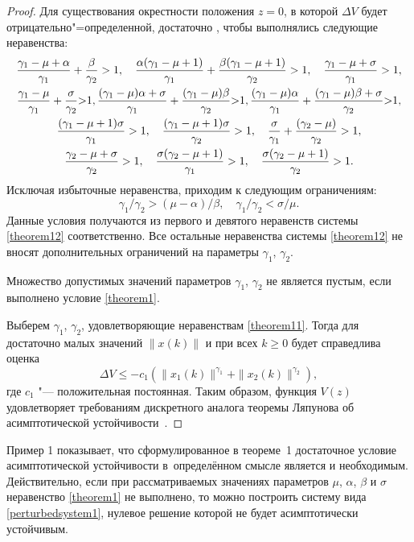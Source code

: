 \begin{proof}
Для существования окрестности положения $z=0$, в которой $\Delta
V$ будет отрицательно"=определенной, достаточно \cite{sultan:bib5}, чтобы выполнялись
следующие неравенства:
\begin{gather}
\notag
\frac{\gamma_1-\mu+\alpha}{\gamma_1}+\frac{\beta}{\gamma_2}>1,
\quad
\frac{\alpha(\gamma_1-\mu+1)}{\gamma_1}+\frac{\beta(\gamma_1-\mu+1)}{\gamma_2}>1,
\quad
\frac{\gamma_1-\mu+\sigma}{\gamma_1}>1,\\ \notag
\frac{\gamma_1-\mu}{\gamma_1}+\frac{\sigma}{\gamma_2}{>}1, 
\frac{(\gamma_1-\mu)\alpha+\sigma}{\gamma_1}+\frac{(\gamma_1-\mu)\beta}{\gamma_2}{>}1, 
\frac{(\gamma_1-\mu)\alpha}{\gamma_1}+\frac{(\gamma_1-\mu)\beta+\sigma}{\gamma_2}{>}1,\\
\frac{(\gamma_1-\mu+1)\sigma}{\gamma_1}>1,\quad
\frac{(\gamma_1-\mu+1)\sigma}{\gamma_2}>1, \quad \frac{\sigma}{\gamma_1}+\frac{(\gamma_2-\mu)}{\gamma_2}>1,\label{theorem12}\\
\notag
\frac{\gamma_2-\mu+\sigma}{\gamma_2}>1, \quad
\frac{\sigma(\gamma_2-\mu+1)}{\gamma_1}>1, \quad
\frac{\sigma(\gamma_2-\mu+1)}{\gamma_2}>1.
\end{gather}
Исключая избыточные неравенства, приходим к следующим ограничениям:
\begin{equation}
\gamma_1/\gamma_2>(\mu-\alpha)/\beta,
\quad\gamma_1/\gamma_2<\sigma/\mu.\label{theorem11}
\end{equation}
Данные условия получаются из первого и
девятого неравенств системы \eqref{theorem12} соответственно.
Все остальные неравенства системы \eqref{theorem12} не
вносят дополнительных ограничений на параметры $\gamma_1$,
$\gamma_2$.

Множество допустимых значений параметров $\gamma_1$, $\gamma_2$ не
является пустым, если выполнено условие \eqref{theorem1}.

Выберем $\gamma_1$, $\gamma_2$, удовлетворяющие неравенствам
\eqref{theorem11}. Тогда для достаточно малых значений
$\|x(k)\|$ и при всех $k\geq 0$ будет справедлива оценка
$$
\Delta V\leq-c_1
\left(\|x_1(k)\|^{\gamma_1}+\|x_2(k)\|^{\gamma_2}\right),
$$
где $c_1$ "--- положительная постоянная. Таким образом, функция
$V(z)$ удовлетворяет  требованиям дискретного аналога теоремы
Ляпунова об асимптотической устойчивости~\cite{sultan:bib8}. 
\end{proof}

\smallskip


\begin{remark}[1] Пример 1 показывает, что сформулированное в
теореме~1 достаточное условие асимптотической устойчивости в~определённом смысле является и необходимым. Действительно, если
при рассматриваемых значениях параметров $\mu$, $\alpha$, $\beta$ и
$\sigma$ неравенство \eqref{theorem1} не выполнено, то можно
построить систему вида \eqref{perturbedsystem1}, нулевое решение которой не
будет асимптотически устойчивым.
\end{remark}

